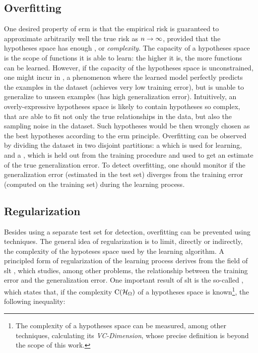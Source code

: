 \subsection{Overfitting}
One desired property of \gls{erm} is that the empirical risk is guaranteed to approximate arbitrarily well the true risk as $n \shortrightarrow \infty$, provided that the hypotheses space has enough , or \emph{complexity}. The capacity of a hypotheses space is the scope of functions it is able to learn: the higher it is, the more  functions can be learned. However, if the capacity of the hypotheses space is unconstrained, one might incur in , a phenomenon where the learned model perfectly predicts the examples in the dataset (achieves very low training error), but is unable to generalize to unseen examples (has high generalization error). Intuitively, an overly-expressive hypotheses space is likely to contain hypotheses so complex, that are able to fit not only the true relationships in the data, but also the sampling noise in the dataset. Such hypotheses would be then wrongly chosen as the best hypotheses according to the \gls{erm} principle. Overfitting can be observed by dividing the dataset in two disjoint partitions: a  which is used for learning, and a , which is held out from the training procedure and used to get an estimate of the true generalization error. To detect overfitting, one should monitor if the generalization error (estimated in the test set) diverges from the training error (computed on the training set) during the learning process.

\subsection{Regularization}
Besides using a separate test set for detection, overfitting can be prevented \apriori using  techniques. The general idea of regularization is to limit, directly or indirectly, the complexity of the hypoteses space used by the learning algorithm. A principled form of regularization of the learning process derives from the field of \gls{slt} \citep{vapnik2000slt}, which studies, among other problems, the relationship between the training error and the generalization error.  One important result of \gls{slt} is the so-called , which states that, if the complexity $\Fun{C}(\HypSpace)$ of a hypotheses space is known\footnote{The complexity of a hypotheses space can be measured, among other techniques, calculating its \emph{VC-Dimension}, whose precise definition is beyond the scope of this work.}, the following inequality:

